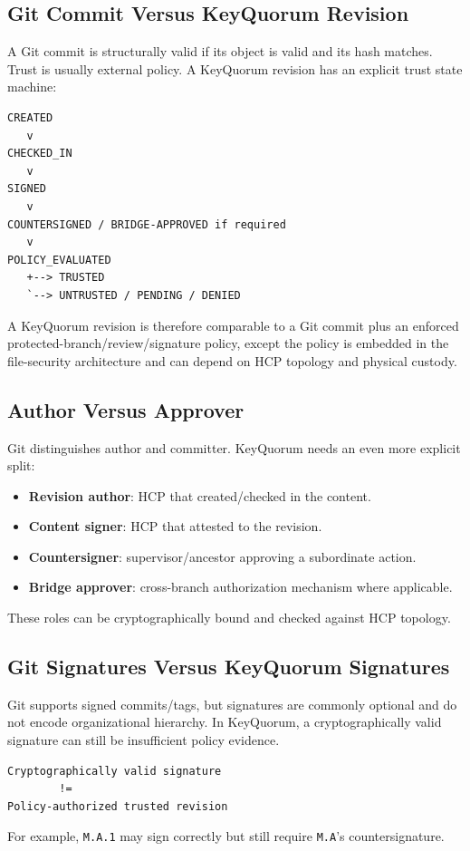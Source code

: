 \documentclass[11pt]{article}
\begin{document}
\subsection{Git Commit Versus KeyQuorum Revision}
A Git commit is structurally valid if its object is valid and its hash matches. Trust is usually external policy. A KeyQuorum revision has an explicit trust state machine:
\begin{lstlisting}
CREATED
   v
CHECKED_IN
   v
SIGNED
   v
COUNTERSIGNED / BRIDGE-APPROVED if required
   v
POLICY_EVALUATED
   +--> TRUSTED
   `--> UNTRUSTED / PENDING / DENIED
\end{lstlisting}
A KeyQuorum revision is therefore comparable to a Git commit plus an enforced protected-branch/review/signature policy, except the policy is embedded in the file-security architecture and can depend on HCP topology and physical custody.

\subsection{Author Versus Approver}
Git distinguishes author and committer. KeyQuorum needs an even more explicit split:
\begin{itemize}[leftmargin=1.5em]
  \item \textbf{Revision author}: HCP that created/checked in the content.
  \item \textbf{Content signer}: HCP that attested to the revision.
  \item \textbf{Countersigner}: supervisor/ancestor approving a subordinate action.
  \item \textbf{Bridge approver}: cross-branch authorization mechanism where applicable.
\end{itemize}
These roles can be cryptographically bound and checked against HCP topology.

\subsection{Git Signatures Versus KeyQuorum Signatures}
Git supports signed commits/tags, but signatures are commonly optional and do not encode organizational hierarchy. In KeyQuorum, a cryptographically valid signature can still be insufficient policy evidence.
\begin{lstlisting}
Cryptographically valid signature
        !=
Policy-authorized trusted revision
\end{lstlisting}
For example, \texttt{M.A.1} may sign correctly but still require \texttt{M.A}'s countersignature.
\end{document}
